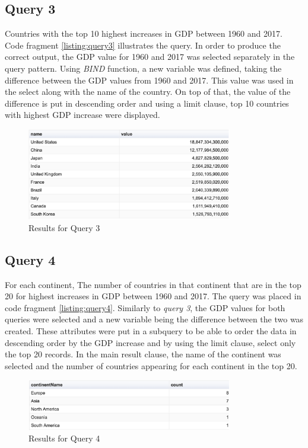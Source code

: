 \documentclass[11pt]{article}
\begin{document}
\subsection{Query 3\label{subsec:query3}} 
Countries with the top 10 highest increases in GDP between 1960 and 2017. Code fragment \ref{listing:query3} illustrates the query. In order to produce the correct output, the GDP value for 1960 and 2017 was selected separately in the query pattern. Using \textit{BIND} function, a new variable was defined, taking the difference between the GDP values from 1960 and 2017. This value was used in the select along with the name of the country. On top of that, the value of the difference is put in descending order and using a limit clause, top 10 countries with highest GDP increase were displayed. 
 
\begin{figure}[H]
  \centering
   \includegraphics[width=0.8\textwidth]{results/Q3.png}
  \caption{Results for Query 3}
  \label{fig:q3}
\end{figure}

\subsection{Query 4\label{subsec:query4}} 
For each continent, The number of countries in that continent that are in the top 20 for highest increases in GDP between 1960 and 2017. The query was placed in code fragment \ref{listing:query4}. Similarly to \textit{query 3}, the GDP values for both queries were selected and a new variable being the difference between the two was created. These attributes were put in a subquery to be able to order the data in descending order by the GDP increase and by using the limit clause, select only the top 20 records. In the main result clause, the name of the continent was selected and the number of countries appearing for each continent in the top 20. 

\begin{figure}[H]
  \centering
   \includegraphics[width=0.8\textwidth]{results/Q4.png}
  \caption{Results for Query 4}
  \label{fig:q4}
\end{figure}
\end{document}
